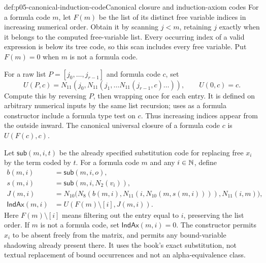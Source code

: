 \begin{hbdefinition}{def:p05-canonical-induction-code}{Canonical closure and induction-axiom codes}
For a formula code \(m\), let \(F(m)\) be the list of its distinct free
variable indices in increasing numerical order.  Obtain it by scanning
\(j<m\), retaining \(j\) exactly when it belongs to the computed
free-variable list.  Every occurring index of a valid expression is below
its tree code, so this scan includes every free variable.  Put \(F(m)=0\)
when \(m\) is not a formula code.

For a raw list \(P=[j_0,\ldots,j_{r-1}]\) and formula code \(c\), set
\[
 U(P,c)=N_{11}(j_0,N_{11}(j_1,\ldots N_{11}(j_{r-1},c)\ldots)),
 \qquad U(0,c)=c.
\]
Compute this by reversing \(P\), then wrapping once for each entry.
It is defined on arbitrary numerical inputs by the same list recursion;
uses as a formula constructor include a formula type test on \(c\).
Thus increasing indices appear from the outside inward.  The canonical
universal closure of a formula code \(c\) is \(U(F(c),c)\).

Let \(\mathsf{sub}(m,i,t)\) be the already specified substitution code
for replacing free \(x_i\) by the term coded by \(t\).  For a formula
code \(m\) and any \(i\in\mathbb{N}\), define
\[
\begin{aligned}
 b(m,i)&=\mathsf{sub}(m,i,o),\\
 s(m,i)&=\mathsf{sub}(m,i,N_2(v_i)),\\
 J(m,i)&=N_{10}\bigl(
    N_8(b(m,i),N_{11}(i,N_{10}(m,s(m,i)))),N_{11}(i,m)\bigr),\\
 \mathsf{IndAx}(m,i)&=U(F(m)\setminus[i],J(m,i)).
\end{aligned}
\]
Here \(F(m)\setminus[i]\) means filtering out the entry equal to \(i\),
preserving the list order.  If \(m\) is not a formula code, set
\(\mathsf{IndAx}(m,i)=0\).  The constructor permits \(x_i\) to be absent
freely from the matrix, and permits any bound-variable shadowing already
present there.  It uses the book's exact substitution, not textual replacement
of bound occurrences and not an alpha-equivalence class.
\end{hbdefinition}

